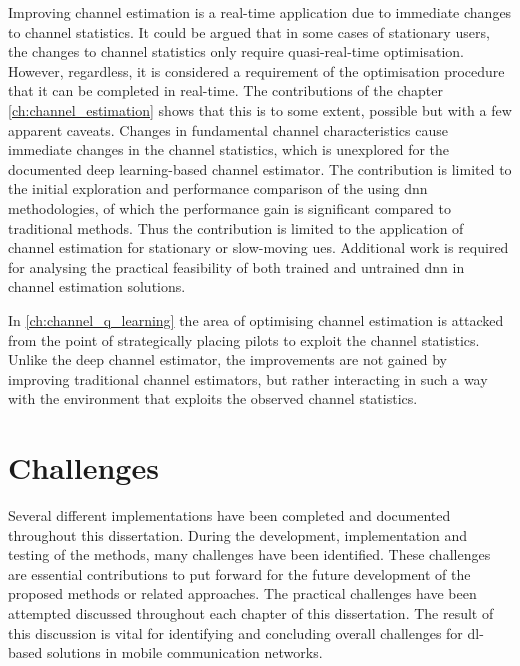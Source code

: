 Improving channel estimation is a real-time application due to immediate changes to channel statistics. It could be argued that in some cases of stationary users, the changes to channel statistics only require quasi-real-time optimisation. However, regardless, it is considered a requirement of the optimisation procedure that it can be completed in real-time. The contributions of the chapter \ref{ch:channel_estimation} shows that this is to some extent, possible but with a few apparent caveats. Changes in fundamental channel characteristics cause immediate changes in the channel statistics, which is unexplored for the documented deep learning-based channel estimator. The contribution is limited to the initial exploration and performance comparison of the using \gls{dnn} methodologies, of which the performance gain is significant compared to traditional methods. Thus the contribution is limited to the application of channel estimation for stationary or slow-moving \glspl{ue}. Additional work is required for analysing the practical feasibility of both trained and untrained \gls{dnn} in channel estimation solutions.

In \ref{ch:channel_q_learning} the area of optimising channel estimation is attacked from the point of strategically placing pilots to exploit the channel statistics. Unlike the deep channel estimator, the improvements are not gained by improving traditional channel estimators, but rather interacting in such a way with the environment that exploits the observed channel statistics. 


\section{Challenges}
Several different implementations have been completed and documented throughout this dissertation. During the development, implementation and testing of the methods, many challenges have been identified. These challenges are essential contributions to put forward for the future development of the proposed methods or related approaches. The practical challenges have been attempted discussed throughout each chapter of this dissertation. The result of this discussion is vital for identifying and concluding overall challenges for \gls{dl}-based solutions in mobile communication networks.


